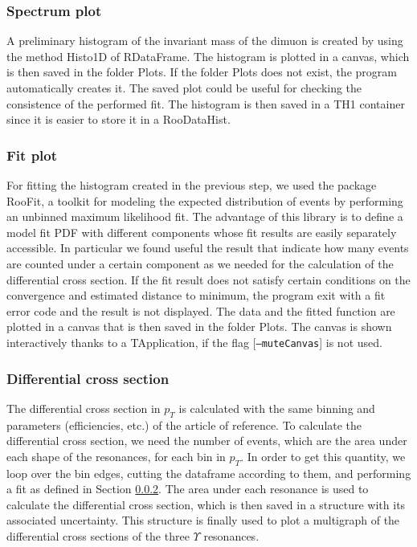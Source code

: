 \documentclass[a4paper,11pt]{article}
\begin{document}
\subsubsection{Spectrum plot}
A preliminary histogram of the invariant mass of the dimuon is created by using the method Histo1D of RDataFrame. The histogram is plotted in a canvas, which is then saved in the folder Plots. If the folder Plots does not exist, the program automatically creates it. The saved plot could be useful for checking the consistence of the performed fit. The histogram is then saved in a TH1 container since it is easier to store it in a RooDataHist.

\subsubsection{Fit plot}\label{fit}
For fitting the histogram created in the previous step, we used the package RooFit, a toolkit for modeling the expected distribution of events by performing an unbinned maximum likelihood fit. The advantage of this library is to define a model fit PDF with different components whose fit results are easily separately accessible. In particular we found useful the result that indicate how many events are counted under a certain component as we needed for the calculation of the differential cross section. 
If the fit result does not satisfy certain conditions on the convergence and estimated distance to minimum, the program exit with a fit error code and the result is not displayed.
The data and the fitted function are plotted in a canvas that is then saved in the folder Plots. The canvas is shown interactively thanks to a TApplication, if the flag [\texttt{--muteCanvas}] is not used.

\subsubsection{Differential cross section}
The differential cross section in $p_T$ is calculated with the same binning and parameters (efficiencies, etc.) of the article of reference. 
To calculate the differential cross section, we need the number of events, which are the area under each shape of the resonances, for each bin in $p_T$. In order to get this quantity, we loop over the bin edges, cutting the dataframe according to them, and performing a fit as defined in Section \ref{fit}. The area under each resonance is used to calculate the differential cross section, which is then saved in a structure with its associated uncertainty. This structure is finally used to plot a multigraph of the differential cross sections of the three $\Upsilon$ resonances.
\end{document}
